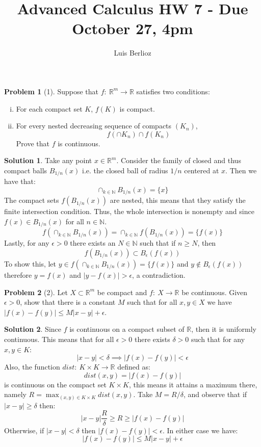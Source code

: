 \documentclass{article}
\theoremstyle{definition}
\newtheorem*{soln}{Solution}
\newtheorem*{prob}{Problem}
\theoremstyle{theorem}
\newcommand{\R}{\mathbb{R}}
\newcommand{\N}{\mathbb{N}}
\begin{document}
\title{Advanced Calculus HW 7 - Due October 27, 4pm}
\author{Luis Berlioz}
\maketitle



\begin{prob}[1]
    Suppose that $f:\ \R^m \to \R$ satisfies two conditions:
    \begin{enumerate}[(i)]
        \item For each compact set $K$, $f(K)$ is compact.
        \item For every nested decreasing sequence of compacts $(K_n)$,
            $$f(\cap K_n)  \cap f(K_n)$$
            Prove that $f$ is continuous.
    \end{enumerate}
\end{prob}
\begin{soln}
    Take any point $x\in \R^m$. Consider the family of closed and thus compact balls $B_{1/n }(x)$ i.e. the closed ball of radius $1/n$ centered at $x$. Then we have that:
    $$\cap_{k\in \N }B_{1/n }(x) =\{x  \}$$
    The compact sets $f(B_{1/n }(x))$ are nested, this means that they satisfy the finite intersection condition. Thus, the whole intersection is nonempty and since $f(x)\in B_{1/n }(x)$ for all $n\in \N$.
    $$f\left(\cap_{k\in \N }B_{1/n }(x)\right)= \cap_{k\in \N }f(B_{1/n }(x))=\{ f(x)\} $$
    Lastly, for any $\epsilon >0$ there exists an $N\in \N$ such that if $n\geq N$, then 
    $$f(B_{1/n }(x)) \subset B_\epsilon (f(x))  $$
    To show this, let $y\in f\left(\cap_{k\in \N }B_{1/n }(x)\right) = \{f(x)  \}$ and $y\notin B_\epsilon (f(x))$ therefore $y=f(x)$ and $| y-f(x)| >\epsilon$, a contradiction.
\end{soln}
\vspace{1in}



\begin{prob}[2]
    Let $X\subset \R^m$ be compact and $f:\ X\to \R$ be continuous. Given $\epsilon > 0$, show that there is a constant $M$ such that for all $x,y\in X$ we have $|f(x) -f(y)| \leq M|x-y| + \epsilon$. 
\end{prob}
\begin{soln}
    Since $f$ is continuous on a compact subset of $\R$, then it is uniformly continuous. This means that for all $\epsilon >0$ there exists $\delta >0$ such that for any $x,y\in K$:
    $$|x-y|<\delta \implies |f(x) -f(y)|<\epsilon$$
    Also, the function $dist:\ K\times K \to \R$ defined as:
    $$dist(x,y) = |f(x) - f(y)|$$ 
    is continuous on the compact set $K\times K$, this means it attains  a maximum there, namely $R = \max_{(x,y)\in K\times K }dist(x,y)$. Take $M = R/\delta$, and observe that if $|x-y| \geq \delta$ then:
    $$|x-y| \frac R\delta \geq R \geq |f(x) -f(y)|$$
    Otherwise, if $|x-y|<\delta$ then $|f(x)-f(y)|< \epsilon$. In either case we have:
    $$|f(x)-f(y)| \leq M|x-y| +\epsilon$$
\end{soln}
\vspace{1in}
\end{document}
